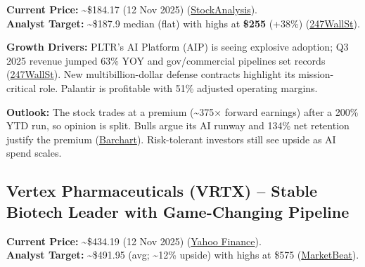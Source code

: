 \documentclass[
]{article}
\begin{document}
\textbf{Current Price:} \textasciitilde\$184.17 (12 Nov 2025)
(\href{https://stockanalysis.com/stocks/pltr/history/\#:~:text=Date\%20Open\%20High\%20Low\%20Close,87\%2C764\%2C245}{StockAnalysis}).\\
\textbf{Analyst Target:} \textasciitilde\$187.9 median (flat) with highs
at \textbf{\$255} (+38\%)
(\href{https://247wallst.com/investing/2025/11/12/palantir-technologies-nasdaq-pltr-stock-price-prediction-for-2025-where-will-it-be-in-1-year/\#:~:text=Most\%20Wall\%20Street\%20analysts\%20are,end\%20price\%20target\%20at\%20\%2450.00}{247WallSt}).

\textbf{Growth Drivers:} PLTR's AI Platform (AIP) is seeing explosive
adoption; Q3 2025 revenue jumped 63\% YOY and gov/commercial pipelines
set records
(\href{https://247wallst.com/investing/2025/11/12/palantir-technologies-nasdaq-pltr-stock-price-prediction-for-2025-where-will-it-be-in-1-year/\#:~:text=When\%20the\%20company\%20reported\%20Q3,same\%20quarter\%20a\%20year\%20ago}{247WallSt}).
New multibillion-dollar defense contracts highlight its mission-critical
role. Palantir is profitable with 51\% adjusted operating margins.

\textbf{Outlook:} The stock trades at a premium (\textasciitilde375×
forward earnings) after a 200\% YTD run, so opinion is split. Bulls
argue its AI runway and 134\% net retention justify the premium
(\href{https://www.barchart.com/story/news/36082191/is-it-too-late-to-buy-palantir-stock-in-november-2025\#:~:text=marking\%20the\%20company’s\%20best\%20quarter,existing\%20clients\%20are\%20spending\%20significantly}{Barchart}).
Risk-tolerant investors still see upside as AI spend scales.

\hypertarget{vertex-pharmaceuticals-vrtx-stable-biotech-leader-with-game-changing-pipeline}{%
\subsection{Vertex Pharmaceuticals (VRTX) -- Stable Biotech Leader with
Game-Changing
Pipeline}\label{vertex-pharmaceuticals-vrtx-stable-biotech-leader-with-game-changing-pipeline}}

\textbf{Current Price:} \textasciitilde\$434.19 (12 Nov 2025)
(\href{https://finance.yahoo.com/quote/VRTX/history/\#:~:text=,38}{Yahoo
Finance}).\\
\textbf{Analyst Target:} \textasciitilde\$491.95 (avg;
\textasciitilde12\% upside) with highs at \$575
(\href{https://www.marketbeat.com/stocks/NASDAQ/VRTX/forecast/\#:~:text=\%24491.95\%2011.63}{MarketBeat}).
\end{document}
